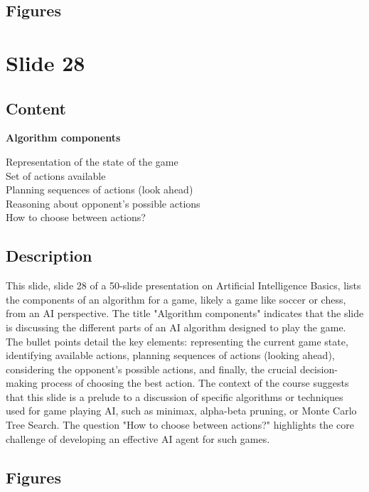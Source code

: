 \documentclass{article}%
\begin{document}
\subsection{Figures}%
\begin{figure}[H]%
\centering%
\end{figure}

%
\newpage%
\section{Slide 28}%
\label{sec:Slide28}%
\subsection{Content}%

\textbf{Algorithm components}

Representation of the state of the game \\
Set of actions available \\
Planning sequences of actions (look ahead) \\
Reasoning about opponent's possible actions \\
How to choose between actions?
%
\subsection{Description}%
This slide, slide 28 of a 50-slide presentation on Artificial Intelligence Basics, lists the components of an algorithm for a game, likely a game like soccer or chess, from an AI perspective.  The title "Algorithm components" indicates that the slide is discussing the different parts of an AI algorithm designed to play the game.  The bullet points detail the key elements:  representing the current game state, identifying available actions, planning sequences of actions (looking ahead), considering the opponent's possible actions, and finally, the crucial decision-making process of choosing the best action.  The context of the course suggests that this slide is a prelude to a discussion of specific algorithms or techniques used for game playing AI, such as minimax, alpha-beta pruning, or Monte Carlo Tree Search.  The question "How to choose between actions?" highlights the core challenge of developing an effective AI agent for such games.%
\subsection{Figures}%
\begin{figure}[H]%
\centering%
\end{figure}
\end{document}
